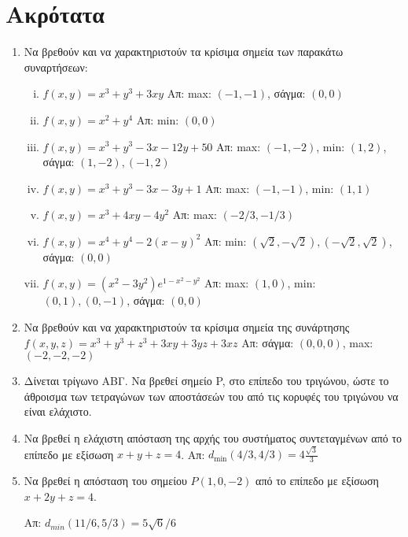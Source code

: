 \section*{Ακρότατα}

\begin{enumerate}
  \item Να βρεθούν και να χαρακτηριστούν τα κρίσιμα σημεία  των παρακάτω συναρτήσεων:
    \begin{enumerate}[i)]
      \item $ f(x,y) = x^{3} + y^{3} + 3xy $ 
        \hfill Απ: max: $(-1,-1)  $, σάγμα: $ (0,0) $
      \item $ f(x,y) = x^{2}+y^{4} $ 
        \hfill Απ: min: $ (0,0) $ 
      \item $ f(x,y) = x^{3} + y^{3} - 3x -12y + 50 $ 
        \hfill Απ: max: $ (-1,-2)$, min: $ (1,2) $, 
        σάγμα: $ (1,-2), (-1,2) $
      \item $ f(x,y) = x^{3} + y^{3} -3x -3y + 1 $ 
        \hfill Απ: max: $(-1,-1)  $, min: $ (1,1) $
      \item $ f(x,y) = x^{3} + 4xy -4y^{2} $ 
        \hfill Απ: max: $ (-2/3, -1/3)  $
      \item $ f(x,y) = x^{4} + y^{4} -2(x-y)^{2}$  
        \hfill Απ: min: $ (\sqrt{2} , -\sqrt{2}), (-\sqrt{2} , \sqrt{2}) $, 
        σάγμα: $ (0,0) $
      \item $ f(x,y) = (x^{2}-3y^{2})e^{1-x^{2}-y^{2}} $ 
        \hfill Απ: max: $ (1,0)$, min: $ (0,1), (0,-1) $, 
        σάγμα: $ (0,0) $
    \end{enumerate}

  \item Να βρεθούν και να χαρακτηριστούν τα κρίσιμα σημεία της συνάρτησης 
    $ f(x,y,z) = x^{3} + y^{3}+z^{3} + 3xy +3yz + 3xz $
    \hfill Απ: σάγμα: $(0,0,0)$, max: $(-2,-2,-2)$  

  \item Δίνεται τρίγωνο ΑΒΓ. Να βρεθεί σημείο P, στο επίπεδο του τριγώνου, ώστε 
    το άθροισμα των τετραγώνων των αποστάσεών του από τις κορυφές του τριγώνου 
    να είναι ελάχιστο.

  \item Να βρεθεί η ελάχιστη απόσταση της αρχής του συστήματος συντεταγμένων από το 
    επίπεδο με εξίσωση $ x+y+z=4 $. 
    \hfill Απ: $ d_{\min}(4/3,4/3) = 4\frac{\sqrt{3}}{3} $  

  \item Να βρεθεί η απόσταση του σημείου $ P(1,0,-2) $ από το επίπεδο με εξίσωση 
    $ x+2y+z=4 $. 
    
    \hfill Απ: $ d_{min}(11/6,5/3) = 5 \sqrt{6} /6 $ 
\end{enumerate}


